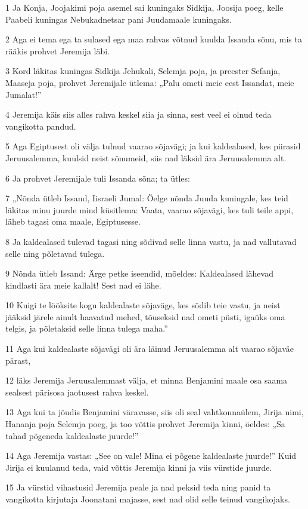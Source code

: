 \par 1 Ja Konja, Joojakimi poja asemel sai kuningaks Sidkija, Joosija poeg, kelle Paabeli kuningas Nebukadnetsar pani Juudamaale kuningaks.
\par 2 Aga ei tema ega ta sulased ega maa rahvas võtnud kuulda Issanda sõnu, mis ta rääkis prohvet Jeremija läbi.
\par 3 Kord läkitas kuningas Sidkija Jehukali, Selemja poja, ja preester Sefanja, Maaseja poja, prohvet Jeremijale ütlema: „Palu ometi meie eest Issandat, meie Jumalat!”
\par 4 Jeremija käis siis alles rahva keskel siia ja sinna, sest veel ei olnud teda vangikotta pandud.
\par 5 Aga Egiptusest oli välja tulnud vaarao sõjavägi; ja kui kaldealased, kes piirasid Jeruusalemma, kuulsid neist sõnumeid, siis nad läksid ära Jeruusalemma alt.
\par 6 Ja prohvet Jeremijale tuli Issanda sõna; ta ütles:
\par 7 „Nõnda ütleb Issand, Iisraeli Jumal: Öelge nõnda Juuda kuningale, kes teid läkitas minu juurde mind küsitlema: Vaata, vaarao sõjavägi, kes tuli teile appi, läheb tagasi oma maale, Egiptusesse.
\par 8 Ja kaldealased tulevad tagasi ning sõdivad selle linna vastu, ja nad vallutavad selle ning põletavad tulega.
\par 9 Nõnda ütleb Issand: Ärge petke iseendid, mõeldes: Kaldealased lähevad kindlasti ära meie kallalt! Sest nad ei lähe.
\par 10 Kuigi te lööksite kogu kaldealaste sõjaväge, kes sõdib teie vastu, ja neist jääksid järele ainult haavatud mehed, tõuseksid nad ometi püsti, igaüks oma telgis, ja põletaksid selle linna tulega maha.”
\par 11 Aga kui kaldealaste sõjavägi oli ära läinud Jeruusalemma alt vaarao sõjaväe pärast,
\par 12 läks Jeremija Jeruusalemmast välja, et minna Benjamini maale osa saama sealsest pärisosa jaotusest rahva keskel.
\par 13 Aga kui ta jõudis Benjamini väravasse, siis oli seal vahtkonnaülem, Jirija nimi, Hananja poja Selemja poeg, ja too võttis prohvet Jeremija kinni, öeldes: „Sa tahad põgeneda kaldealaste juurde!”
\par 14 Aga Jeremija vastas: „See on vale! Mina ei põgene kaldealaste juurde!” Kuid Jirija ei kuulanud teda, vaid võttis Jeremija kinni ja viis vürstide juurde.
\par 15 Ja vürstid vihastusid Jeremija peale ja nad peksid teda ning panid ta vangikotta kirjutaja Joonatani majasse, sest nad olid selle teinud vangikojaks.
